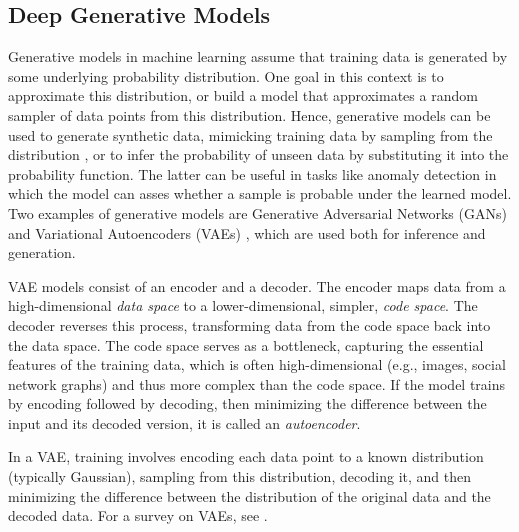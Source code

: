 \documentclass[letterpaper]{article} %
\newcommand{\ron}[1]{{{\textcolor{red}{\textbf{[Ron:} {#1}\textbf{]}}}}}
\begin{document}
\subsection{Deep Generative Models}
\label{extended_sec:generative_models}
Generative models in machine learning assume that training data is generated by some underlying probability distribution. One goal in this context is to approximate this distribution, or build a model that approximates a random sampler of data points from this distribution. Hence, generative models can be used to generate synthetic data, mimicking training data by sampling from the distribution 
\cite{harshvardhan2020comprehensive,dinh2016density,mohamed2016learning}, 
or to infer the probability of unseen data by substituting it into the probability function. 
The latter can be useful in tasks like anomaly detection \cite{pang2021anomalynotgraph} in which the model can asses whether a sample is probable under the learned model. 
Two examples of generative models are Generative Adversarial Networks (GANs) \cite{goodfellow2014gan,radford2015dcgan} and Variational Autoencoders (VAEs) \cite{kingma2013vae}, which are used both for inference and generation. 

VAE models consist of an encoder and a decoder. The encoder maps data from a high-dimensional \emph{data space} to a lower-dimensional, simpler, \emph{code space}. The decoder reverses this process, transforming data from the code space back into the data space. The code space serves as a bottleneck, capturing the essential features of the training data, which is often high-dimensional (e.g., images, social network graphs) and thus more complex than the code space. If the model trains by encoding followed by decoding, then minimizing the difference between the input and its decoded version, it is called an \emph{autoencoder}.

In a VAE, training involves encoding each data point to a known distribution (typically Gaussian), sampling from this distribution, decoding it, and then minimizing the difference between the distribution of the original data and the decoded data. For a survey on VAEs, see \cite{tschannen2018vaesurvay}. 

\end{document}
